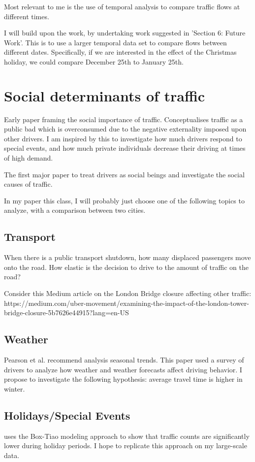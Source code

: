 \documentclass[11pt, oneside]{article}
\begin{document}
\begin{spacing}{2}
Most relevant to me is the use of temporal analysis to compare traffic flows at different times. 

I will build upon the work, by undertaking work suggested in 'Section 6: Future Work'. This is to use a larger temporal data set to compare flows between different dates. Specifically, if we are interested in the effect of the Christmas holiday, we could compare December 25th to January 25th. 

\section{Social determinants of traffic}

\autocite{10.2307/1911814} Early paper framing the social importance of traffic. Conceptualises traffic as a public bad which is overconsumed due to the negative externality imposed upon other drivers. I am inspired by this to investigate how much drivers respond to special events, and how much private individuals decrease their driving at times of high demand.

\autocite{10.1007/3-540-48238-5_28} The first major paper to treat drivers as social beings and investigate the social causes of traffic.

In my paper this class, I will probably just choose one of the following topics to analyze, with a comparison between two cities.

\subsection{Transport}

When there is a public transport shutdown, how many displaced passengers move onto the road. How elastic is the decision to drive to the amount of traffic on the road?

Consider this Medium article on the London Bridge closure affecting other traffic: https://medium.com/uber-movement/examining-the-impact-of-the-london-tower-bridge-closure-5b7626e44915?lang=en-US

\subsection{Weather}

Pearson et al. recommend analysis seasonal trends. This paper \autocite{KILPELAINEN2007288}  used a survey of drivers to analyze how weather and weather forecasts affect driving behavior.
I propose to investigate the following hypothesis: average travel time is higher in winter.

\subsection{Holidays/Special Events}

\autocite{cools2007investigating} uses the Box-Tiao modeling approach to show that traffic counts are significantly lower during holiday periods. I hope to replicate this approach on my large-scale data.

\newpage
\printbibliography

\end{spacing}
\end{document}
